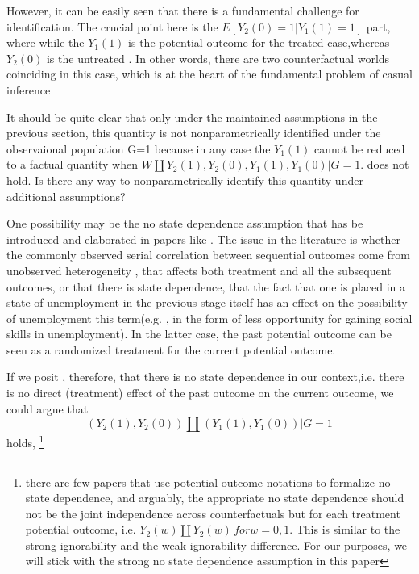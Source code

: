 \documentclass{article}
\begin{document}
However, it can be easily seen that there is a fundamental challenge for identification.
The crucial point here is the $ E [ Y_2(0) = 1 | Y_1(1) = 1] $ part, where while the $Y_1(1) $ 
is the potential outcome for the treated case,whereas $ Y_2(0) $ is the untreated . In other words, there are two counterfactual worlds coinciding in this case, which is at the heart of the fundamental problem of casual inference \cite{imbens2015causal}

It should be quite clear that only under the maintained assumptions in the previous section, this quantity is not nonparametrically identified under the observaional population G=1 because in any case the  $Y_1(1)$ cannot be reduced to a factual quantity when $ W \amalg Y_2(1) ,Y_2(0), Y_1(1), Y_1(0) |G=1$. does not hold.
Is there any way to nonparametrically identify this quantity under additional assumptions?

One possibility may be the no state dependence assumption that has be introduced and elaborated in papers like \cite{heckman1981heterogeneity,heckman1984method,torgovitsky2019nonparametric}. The issue in the literature is whether the commonly observed serial correlation between sequential outcomes come from unobserved heterogeneity , that affects both treatment and all the subsequent outcomes, or that there is state dependence, that the fact that one is placed in a state of unemployment in the previous stage itself has an effect on the possibility of unemployment this term(e.g. , in the form of less opportunity for gaining social skills in unemployment). In the latter case, the past potential outcome can be seen as a randomized treatment for the current potential outcome.

If we posit , therefore, that there is no state dependence in our context,i.e. there is no direct (treatment) effect of the past outcome on the current outcome, we could argue that 
\begin{equation}
    (Y_2(1), Y_2(0) ) \amalg (Y_1(1) , Y_1(0) ) | G=1 
\end{equation}
holds, \footnote{  there are few papers that use potential outcome notations to formalize no state dependence, and arguably, the appropriate no state dependence should not be the joint independence across counterfactuals but for each treatment potential outcome, i.e. $ Y_2(w) \amalg Y_2(w) \, for w= 0,1 $. This is similar to the strong ignorability \cite{rosenbaum1983central} and the weak ignorability \cite{imbens2015causal} difference. For our purposes, we will stick with the strong no state dependence assumption in this paper }   
\end{document}
